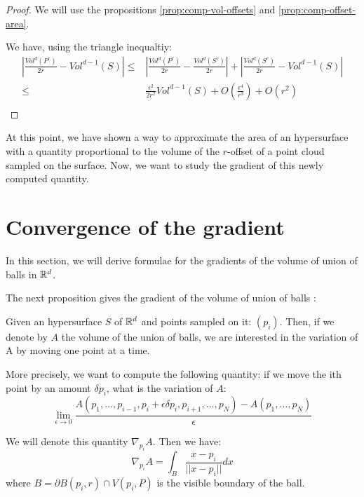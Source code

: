 \begin{proof}
    We will use the propositions \ref{prop:comp-vol-offsets} and
    \ref{prop:comp-offset-area}.

    We have, using the triangle inequaltiy:
    \begin{align*}
        \left| \frac{Vol^d(P^r)}{2r} - Vol^{d-1}(S) \right| \leq& \left| \frac{Vol^d(P^r)}{2r} -
            \frac{Vol^d(S^r)}{2r} \right| + \left| \frac{Vol^d(S^r)}{2r} -
            Vol^{d-1}(S) \right| \\
        \leq& \frac{\epsilon^2}{2r^2} Vol^{d-1}(S) + O(\frac{\epsilon^4}{r^3}) + O(r^2) \\
    \end{align*}
\end{proof}

At this point, we have shown a way to approximate the area of an hypersurface
with a quantity proportional to the volume of the $r$-offset of a point cloud
sampled on the surface.
Now, we want to study the gradient of this newly computed quantity.

\section{Convergence of the gradient}

In this section, we will derive formulae for the gradients of the volume of
union of balls in $ \mathbb{R}^d $.

The next proposition gives the gradient of the volume of union of balls :
\begin{proposition}
    Given an hypersurface $ S $ of $ \mathbb{R}^d $ and points sampled on it: $ (p_i) $.
    Then, if we denote by $ A $ the volume of the union of balls, we are
    interested in the variation of A by moving one point at a time.

    More precisely, we want to compute the following quantity: if we move the
    ith point by an amount $ \delta p_i $, what is the variation of $ A $:
    $$ \lim\limits_{\epsilon \to 0} \frac{A(p_1, \ldots, p_{i-1}, p_i + \epsilon
        \delta p_i, p_{i+1}, \ldots, p_N) - A(p_1, \ldots, p_N)}{\epsilon} $$

    We will denote this quantity $ \nabla_{p_i} A $. Then we have:
    \begin{equation}
        \label{eqn:gradient_area_2d}
        \nabla_{p_i} A = \int_{B} \frac{x - p_i}{||x - p_i||} dx
    \end{equation}
    where $ B = \partial B(p_i, r) \cap V(p_i, P) $ is the visible boundary of
    the ball.
\end{proposition}


